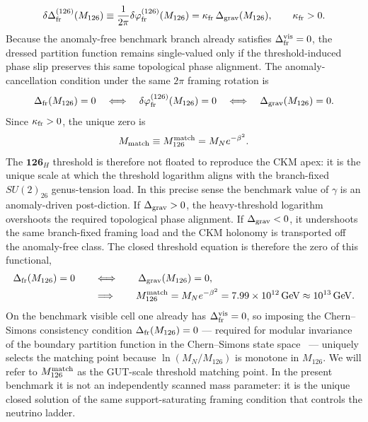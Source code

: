 \documentclass[11pt]{article}
\begin{document}
\begin{equation}
 \delta\Delta_{\rm fr}^{(126)}(M_{126})
 \equiv
 \frac{1}{2\pi}\delta\varphi_{\rm fr}^{(126)}(M_{126})
 =
 \kappa_{\rm fr}\,\Delta_{\rm grav}(M_{126}),
 \qquad
 \kappa_{\rm fr}>0.
\end{equation}
Because the anomaly-free benchmark branch already satisfies
$\Delta_{\rm fr}^{\rm vis}=0$, the dressed partition function remains
single-valued only if the threshold-induced phase slip preserves this same
topological phase alignment. The anomaly-cancellation condition under the same $2\pi$ framing rotation is
\begin{equation}
 \Delta_{\rm fr}(M_{126})=0
 \quad\Longleftrightarrow\quad
 \delta\varphi_{\rm fr}^{(126)}(M_{126})=0
 \quad\Longleftrightarrow\quad
 \Delta_{\rm grav}(M_{126})=0.
\end{equation}
Since $\kappa_{\rm fr}>0$, the unique zero is
\begin{equation}
 M_{\rm match}\equiv M_{126}^{\rm match}=M_Ne^{-\beta^2}.
\end{equation}
The $\mathbf{126}_H$ threshold is therefore not floated to reproduce the CKM apex:
it is the unique scale at which the threshold logarithm aligns with the
branch-fixed $SU(2)_{26}$ genus-tension load. In this precise sense the benchmark
value of $\gamma$ is an anomaly-driven post-diction.
If $\Delta_{\rm grav}>0$, the heavy-threshold logarithm overshoots the required topological phase alignment. If $\Delta_{\rm grav}<0$, it undershoots the same branch-fixed framing load and the CKM holonomy is transported off the anomaly-free class. The closed threshold equation is therefore the zero of this functional,
\begin{equation}
 \begin{aligned}
  \Delta_{\rm fr}(M_{126})=0
  &\qquad\Longleftrightarrow\qquad
  \Delta_{\rm grav}(M_{126})=0,\\
  &\qquad\Longrightarrow\qquad
  M_{126}^{\rm match}
  = M_N e^{-\beta^2}
  = 7.99\times10^{12}\,\mathrm{GeV}
  \approx 10^{13}\,\mathrm{GeV}.
 \end{aligned}
\end{equation}
On the benchmark visible cell one already has $\Delta_{\rm fr}^{\rm vis}=0$, so imposing the Chern--Simons consistency condition $\Delta_{\rm fr}(M_{126})=0$ --- required for modular invariance of the boundary partition function in the Chern--Simons state space~\cite{witten1989} --- uniquely selects the matching point because $\ln(M_N/M_{126})$ is monotone in $M_{126}$. We will refer to $M_{126}^{\rm match}$ as the GUT-scale threshold matching point. In the present benchmark it is not an independently scanned mass parameter: it is the unique closed solution of the same support-saturating framing condition that controls the neutrino ladder.
\end{document}
